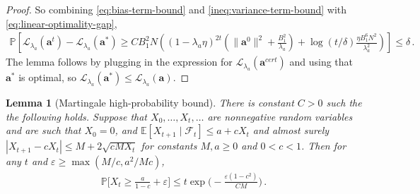 \documentclass[11pt]{article}
\renewcommand{\P}{\mathbb{P}}
\newcommand{\E}{\mathbb{E}}
\newcommand{\eps}{\varepsilon}
\newcommand{\<}{\langle}
\renewcommand{\>}{\rangle}
\newtheorem{lemma}{Lemma}
\theoremstyle{definition}
\def\ba{{\boldsymbol a}}
\def\cL{{\mathcal L}}
\def\cF{{\mathcal F}}
\def\ba{{\boldsymbol a}}
\def\cF{{\mathcal F}}
\def\eps{\varepsilon}
\begin{document}
\begin{proof}
So combining \eqref{eq:bias-term-bound} and \eqref{ineq:variance-term-bound} with \eqref{eq:linear-optimality-gap},
\begin{align*}
\P\left[\cL_{\lambda_a}(\ba^t) - \cL_{\lambda_a}(\ba^*) \geq C B_1^2 N \left((1-\lambda_a \eta)^{2t} (\|\ba^0\|^2 + \frac{B_1^2}{\lambda_a}) + \log(t / \delta) \frac{\eta B_1^6 N^2}{\lambda_a^2}\right)\right] \leq \delta\,.
\end{align*}
The lemma follows by plugging in the expression for $\cL_{\lambda_a}(\ba^{cert})$ and using that $\ba^*$ is optimal, so $\cL_{\lambda_a}(\ba^*) \leq \cL_{\lambda_a}(\ba)$.
\end{proof}








\begin{lemma}[Martingale high-probability bound]\label{lem:technical-martingale-bound}
There is constant $C > 0$ such the the following holds. Suppose that $X_0,\ldots,X_t,\ldots$ are nonnegative random variables and are such that $X_0 = 0$, and $\E[X_{t+1} \mid \cF_t] \leq a + c X_t$ and almost surely $|X_{t+1} - cX_t| \leq M + 2\sqrt{cMX_t}$ for constants $M, a \geq 0$ and $0 < c < 1$. Then for any $t$ and $\eps \geq \max(M/c, a^2 / Mc)$,
\begin{align*}
\P \Big[X_t \geq \frac{a}{1-c} + \eps \Big] \leq t \exp \Big(-\frac{\eps (1-c^2)}{C M} \Big)\,.
\end{align*}
\end{lemma}
\end{document}
